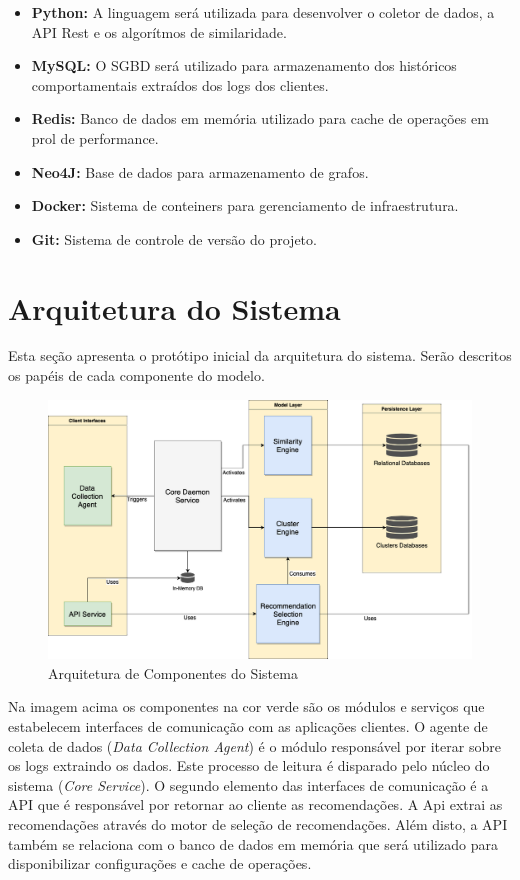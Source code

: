 \documentclass[
	12pt,				%
    oneside,			%
	a4paper,			%
	english,			%
	french,				%
	spanish,			%
	brazil,				%
	]{abntex2}
\begin{document}
\begin{itemize}
	\item \textbf{Python:} A linguagem será utilizada para desenvolver o coletor de dados, a API Rest e os algorítmos de similaridade.
	\item \textbf{MySQL:} O SGBD será utilizado para armazenamento dos históricos comportamentais extraídos dos logs dos clientes.
	\item \textbf{Redis:} Banco de dados em memória utilizado para cache de operações em prol de performance.
	\item \textbf{Neo4J:} Base de dados para armazenamento de grafos.
	\item \textbf{Docker:} Sistema de conteiners para gerenciamento de infraestrutura.
	\item \textbf{Git:} Sistema de controle de versão do projeto.
\end{itemize}

\section{Arquitetura do Sistema}
Esta seção apresenta o protótipo inicial da arquitetura do sistema. Serão descritos os papéis de cada componente do modelo.
\begin{figure}[hbt]
	\label{Arquitetura de Componentes do Sistema}
	\caption{Arquitetura de Componentes do Sistema}
	\includegraphics[width=160mm]{system-architecture.png}
\end{figure}
 
Na imagem acima os componentes na cor verde são os módulos e serviços que estabelecem interfaces de comunicação com as aplicações clientes. O agente de coleta de dados (\textit{Data Collection Agent}) é o módulo responsável por iterar sobre os
logs extraindo os dados. Este processo de leitura é disparado pelo núcleo do sistema (\textit{Core Service}).
O segundo elemento das interfaces de comunicação é a API que é responsável por retornar ao cliente as recomendações. A Api extrai as recomendações através do motor de seleção de recomendações. Além disto, a API também se relaciona com o banco
de dados em memória que será utilizado para disponibilizar configurações e cache de operações.
\end{document}
